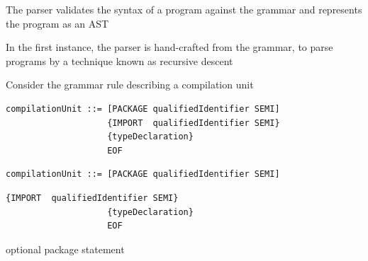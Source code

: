\documentclass[8pt,a4paper,compress]{beamer}
\begin{document}
\begin{frame}[fragile]


The parser validates the syntax of a \jmm program against the \jmm grammar and represents the program as an AST

\bigskip

In the first instance, the parser is hand-crafted from the grammar, to parse programs by a technique known as recursive descent

\bigskip

Consider the grammar rule describing a compilation unit

\smallskip

\begin{overprint}
\begin{tcolorbox}[enhanced,drop shadow southwest,sharp corners,size=fbox,colback=white,fontlower=\small\ttfamily,collower=silver900]

\begin{lstlisting}[language={},style=focusin]
compilationUnit ::= [PACKAGE qualifiedIdentifier SEMI]
                    {IMPORT  qualifiedIdentifier SEMI}
                    {typeDeclaration} 
                    EOF
\end{lstlisting}

\tcblower
\begin{minipage}[t][.25cm][t]{\textwidth}

\end{minipage}
\end{tcolorbox}

\begin{tcolorbox}[enhanced,drop shadow southwest,sharp corners,size=fbox,colback=white,fontlower=\small\ttfamily,collower=silver900]

\begin{lstlisting}[language={},style=focusin,backgroundcolor=\color{lime100}]
compilationUnit ::= [PACKAGE qualifiedIdentifier SEMI]
\end{lstlisting}
\begin{lstlisting}[language={},style=focusout]
                    {IMPORT  qualifiedIdentifier SEMI}
                    {typeDeclaration} 
                    EOF
\end{lstlisting}

\tcblower
\begin{minipage}[t][.25cm][t]{\textwidth}
optional package statement
\end{minipage}
\end{tcolorbox}


\end{overprint}
\end{frame}
\end{document}

